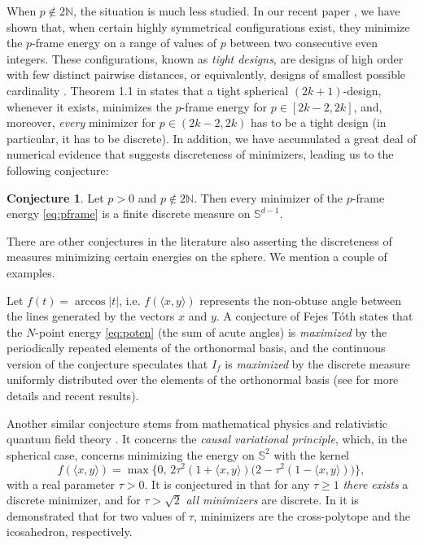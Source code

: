 \documentclass[11pt, leqno]{amsart}
\def\N{\mathbb N}
\def\S{\mathbb S}
\theoremstyle{definition}
\newtheorem{conjecture}[theorem]{Conjecture}
\numberwithin{equation}{section}
\begin{document}
 When $p\not\in 2\N$, the situation is much less studied. In our recent paper \cite{BGMPV}, we have shown that, when certain highly symmetrical configurations exist, they minimize the $p$-frame energy on a range of values of $p$ between two consecutive even integers. These configurations, known as {\em{tight designs}},  are designs of high order with few distinct pairwise distances, or equivalently, designs of smallest possible cardinality \cite{delsarteSpherical1977}.  
 Theorem 1.1 in \cite{BGMPV} states that a tight spherical $(2k+1)$-design, whenever it exists,  minimizes the $p$-frame energy for $p\in [2k-2,2k]$, and, moreover,  {\em{every}} minimizer for $p\in (2k-2,2k)$  has to be a tight design (in particular, it has to be discrete). In addition, we have accumulated  a great deal   of numerical evidence that  suggests discreteness of minimizers, leading us to the following conjecture:
 
 
 \begin{conjecture}\label{conj1} Let  $p>0$ and $p\not\in 2\N$. Then every minimizer of the $p$-frame energy \eqref{eq:pframe} is a finite discrete measure on $\S^{d-1}$. 
 \end{conjecture}
 
 There are other  conjectures  in the literature also asserting the discreteness of measures minimizing certain energies on the sphere. We mention a couple of examples.
 
Let $f( t ) = \arccos |t|$, i.e. $f( \langle x, y \rangle)$ represents the non-obtuse angle between the lines generated by the vectors $x$ and $y$. A conjecture of Fejes T\'oth \cite{FT} states that the $N$-point  energy \eqref{eq:poten} (the sum of acute angles) is {\em{maximized}}  by the periodically repeated elements of the orthonormal basis, and  the  continuous version of the conjecture speculates that $I_f$ is {\em{maximized}}  by the discrete measure uniformly distributed over the elements of the orthonormal basis (see \cite{BM} for more details and recent results).

Another similar conjecture stems from mathematical physics and relativistic quantum field theory \cite{finsterSupport2013,FS2}. It concerns the {\em{causal variational principle}}, which, in the spherical case, concerns minimizing  the energy  on $\S^2$ with the kernel  
\begin{equation}\label{eq:causal}
 f( \langle x, y \rangle) = \max \{ 0,\, 2\tau^2 ( 1+ \langle x, y \rangle ) \big( 2- \tau^2 (1- \langle x, y \rangle ) \big) \big\}, 
 \end{equation}
 with a real parameter $\tau >0$.  It is conjectured in \cite{finsterSupport2013} that for any $\tau \ge 1$ {\em{there exists}} a discrete minimizer, and for $\tau > \sqrt{2}$ {\em{all minimizers}} are discrete. In \cite{BGMPV} it is demonstrated that for two values of $\tau$, minimizers are the cross-polytope  and the icosahedron, respectively. 
\end{document}
